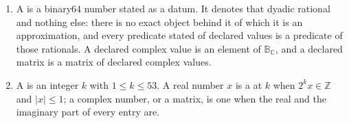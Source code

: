 \begin{definition}
\begin{enumerate}[label=(\roman*),leftmargin=2.4em]
  part of every entry of $a+b$ lie in $\mathbb{B}$.
\item A  is a binary64
  number stated as a datum. It
  denotes that dyadic rational and nothing else: there is no exact object
  behind it of which it is an approximation, and every predicate stated of
  declared values is a predicate of those rationals. A declared complex value
  is an element of $\mathbb{B}_{\mathbb{C}}$, and a declared matrix is a
  matrix of declared complex values.
\item A  is an integer
  $k$ with $1\le k\le53$. A real number $x$ is a  at $k$ when
  $2^{k}x\in\mathbb{Z}$ and
  $|x|\le1$; a complex number, or a matrix, is one when the real and the
  imaginary part of every entry are.
\end{enumerate}
\end{definition}
